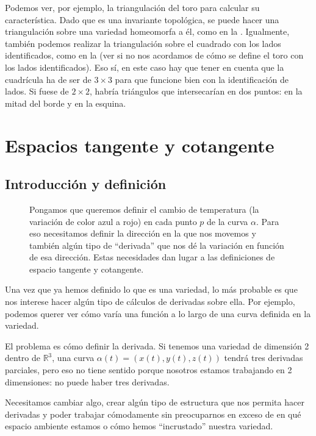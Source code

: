 \documentclass[palatino, bibnumbers]{apuntes}
\begin{document}
Podemos ver, por ejemplo, la triangulación del toro para calcular su característica. Dado que es una invariante topológica, se puede hacer una triangulación sobre una variedad homeomorfa a él, como en la . Igualmente, también podemos realizar la triangulación sobre el cuadrado con los lados identificados, como en la  (ver  si no nos acordamos de cómo se define el toro con los lados identificados). Eso sí, en este caso hay que tener en cuenta que la cuadrícula ha de ser de $3×3$ para que funcione bien con la identificación de lados. Si fuese de $2×2$, habría triángulos que intersecarían en dos puntos: en la mitad del borde y en la esquina.

\chapter{Espacios tangente y cotangente}
\label{chap:EspaciosTangenteyCotangente}

\section{Introducción y definición}

\begin{figure}[hbtp]
\centering
{}
\caption{Pongamos que queremos definir el cambio de temperatura (la variación de color azul a rojo) en cada punto $p$ de la curva $α$. Para eso necesitamos definir la dirección en la que nos movemos y también algún tipo de ``derivada'' que nos dé la variación en función de esa dirección. Estas necesidades dan lugar a las definiciones de espacio tangente y cotangente.}
\end{figure}

Una vez que ya hemos definido lo que es una variedad, lo más probable es que nos interese hacer algún tipo de cálculos de derivadas sobre ella. Por ejemplo, podemos querer ver cómo varía una función a lo largo de una curva definida en la variedad.

El problema es cómo definir la derivada. Si tenemos una variedad de dimensión 2 dentro de $ℝ^3$, una curva $α(t) = (x(t), y(t), z(t))$ tendrá tres derivadas parciales, pero eso no tiene sentido porque nosotros estamos trabajando en 2 dimensiones: no puede haber tres derivadas.

Necesitamos cambiar algo, crear algún tipo de estructura que nos permita hacer derivadas y poder trabajar cómodamente sin preocuparnos en exceso de en qué espacio ambiente estamos o cómo hemos ``incrustado'' nuestra variedad.
\end{document}
